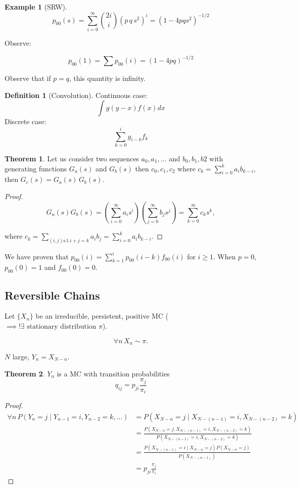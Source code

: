\documentclass{article}
\theoremstyle{definition}
\newtheorem{exmp}{Example}[section]
\newtheorem{defn}{Definition}[section]
\newtheorem{theorem}{Theorem}[section]
\begin{document}
\begin{exmp}[SRW]
$$
p_{00}(s) = \sum_{i=0}^\infty { 2i \choose i} \left( p \, q \, s^2 \right)^i = (1-4pqs^2)^{-1/2}
$$

Observe:

$$
p_{00}(1) = \sum p_{00}(i) = (1-4pq)^{-1/2}
$$

Observe that if $p=q$, this quantity is infinity.

\begin{defn}[Convolution]
Continuous case:
$$
\int g(y-x) f(x) dx
$$
Discrete case:
$$
\sum_{k=0}^i g_{i-k} f_k
$$
\end{defn}

\begin{theorem}
Let us consider two sequences $a_0, a_1, \ldots$ and $b_0, b_1, b2$ with generating functions $G_a(s)$ and $G_b(s)$ then
$c_0,c_1,c_2$ where $c_k = \sum_{i=0}^k a_i b_{k-i}$, then
$G_c(s) = G_a(s) \, G_b(s)$.

\begin{proof}
$$
G_a(s) G_b(s) = \left( \sum_{i=0}^\infty a_i s^i \right) \left( \sum_{j=0}^\infty b_j s^j \right) = \sum_{k=0}^\infty c_k s^k,
$$

where $c_k = \sum_{(i,j) \text{s.t.} i+j=k} a_i b_j = \sum_{i=0}^k a_i b_{k-i}$.
\end{proof}
\end{theorem}

We have proven that $p_{00}(i) = \sum_{k=1}^i p_{00}(i-k) f_{00}(i)$ for $i \ge 1$. When $p=0$, $p_{00}(0) = 1$ and $f_{00}(0) = 0$.

\end{exmp}

\subsection{Reversible Chains}

Let $\{X_n\}$ be an irreducible, persistent, positive MC ($\implies !\exists \text{ stationary distribution } \pi$).

$$
\forall n \, X_n \sim \pi.
$$

$N$ large, $Y_n = X_{N-n}$.

\begin{theorem}
$Y_n$ is a MC with transition probabilities
$$
q_{ij} = p_{ji} \frac{\pi_j}{\pi_i}
$$
\begin{proof}

\begin{align*}
    \forall n \, P\left( Y_n = j \mid Y_{n-1} = i, Y_{n-2} = k, \ldots \right)
    &= P \left( X_{N-n} = j \mid X_{N-(n-1)} = i, X_{N-(n-2)}=k \right) \\
    &= \frac{P \left( X_{N-n} = j, X_{N-(n-1)} = i, X_{N-(n-2)}=k \right) }{P \left( X_{N-(n-1)}=i, X_{N-(n-2)} = k\right)} \\
    &= \frac{P(X_{N-(n-1)} = i \mid X_{N-n} = j) P(X_{N-n} = j) }{P(X_{N-(n-1)})} \\
    &= p_{ji}  \frac{\pi_j}{\pi_i}
\end{align*}

\end{proof}
\end{theorem}
\end{document}
